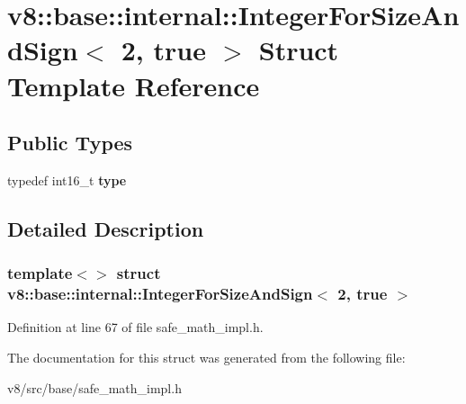 \hypertarget{structv8_1_1base_1_1internal_1_1IntegerForSizeAndSign_3_012_00_01true_01_4}{}\section{v8\+:\+:base\+:\+:internal\+:\+:Integer\+For\+Size\+And\+Sign$<$ 2, true $>$ Struct Template Reference}
\label{structv8_1_1base_1_1internal_1_1IntegerForSizeAndSign_3_012_00_01true_01_4}
\subsection*{Public Types}
\begin{DoxyCompactItemize}
\item 
\mbox{\label{structv8_1_1base_1_1internal_1_1IntegerForSizeAndSign_3_012_00_01true_01_4_af73b142b41d74ad4c0068dc490c862a4}} 
typedef int16\+\_\+t {\bfseries type}
\end{DoxyCompactItemize}


\subsection{Detailed Description}
\subsubsection*{template$<$$>$\newline
struct v8\+::base\+::internal\+::\+Integer\+For\+Size\+And\+Sign$<$ 2, true $>$}



Definition at line 67 of file safe\+\_\+math\+\_\+impl.\+h.



The documentation for this struct was generated from the following file\+:\begin{DoxyCompactItemize}
\item 
v8/src/base/safe\+\_\+math\+\_\+impl.\+h\end{DoxyCompactItemize}
